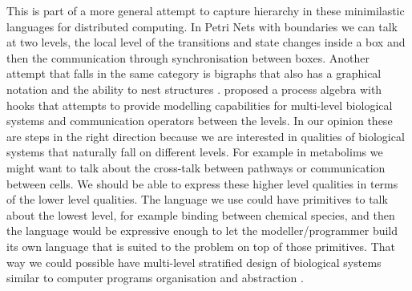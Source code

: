This is part of a more general attempt to capture hierarchy in
these minimilastic languages for distributed computing. In Petri Nets
with boundaries we can talk at two levels, the local level of the
transitions and state changes inside a box and then the communication
through synchronisation between boxes. Another attempt that falls in
the same category is bigraphs that also has a graphical notation and
the ability to nest structures \cite []
{jensen2004bigraphs}. \citet{degasperi2013process} proposed a process
algebra with hooks that attempts to provide modelling capabilities for
multi-level biological systems and communication operators between the
levels. In our opinion these are steps in the right direction because we
are interested in qualities of biological systems that naturally fall
on different levels. For example in metabolims we might want to talk
about the cross-talk between pathways or communication between cells. We should be able to express these higher level
qualities in terms of the lower level qualities. The language we use
could have primitives to talk about the lowest level, for example
binding between chemical species, and then the language would be
expressive enough to let the modeller/programmer build its own
language that is suited to the problem on top of those primitives.
That way we could
possible have multi-level stratified design of biological systems similar
to computer programs organisation and abstraction \cite [] {abelson1987lisp}.

